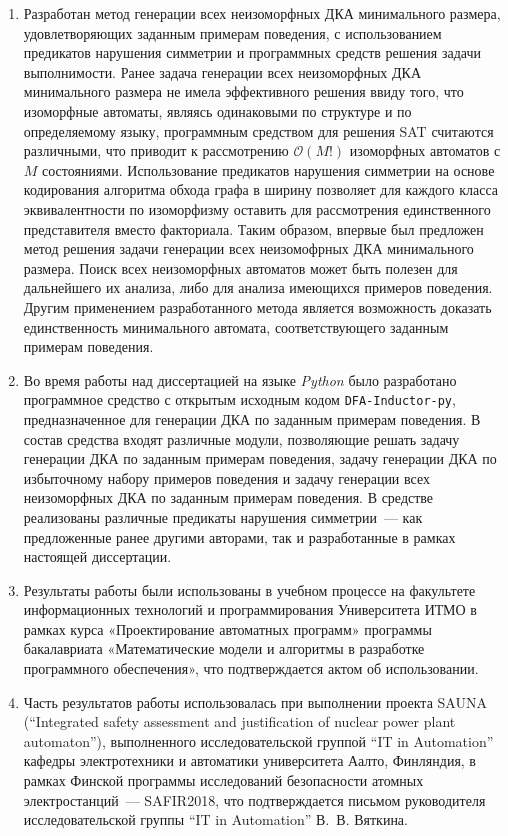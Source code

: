 \begin{enumerate}
  \item Разработан метод генерации всех неизоморфных ДКА минимального размера, удовлетворяющих заданным примерам поведения, с использованием предикатов нарушения симметрии и программных средств решения задачи выполнимости.
  Ранее задача генерации всех неизоморфных ДКА минимального размера не имела эффективного решения ввиду того, что изоморфные автоматы, являясь одинаковыми по структуре и по определяемому языку, программным средством для решения SAT считаются различными, что приводит к рассмотрению $\mathcal{O}\left(M!\right)$ изоморфных автоматов с $M$ состояниями.
  Использование предикатов нарушения симметрии на основе кодирования алгоритма обхода графа в ширину позволяет для каждого класса эквивалентности по изоморфизму оставить для рассмотрения единственного представителя вместо факториала. 
  Таким образом, впервые был предложен метод решения задачи генерации всех неизомофрных ДКА минимального размера.
  Поиск всех неизоморфных автоматов может быть полезен для дальнейшего их анализа, либо для анализа имеющихся примеров поведения.
  Другим применением разработанного метода является возможность доказать единственность минимального автомата, соответствующего заданным примерам поведения.

  \item Во время работы над диссертацией на языке \emph{Python} было разработано программное средство с открытым исходным кодом \texttt{DFA-Inductor-py}, предназначенное для генерации ДКА по заданным примерам поведения.
  В состав средства входят различные модули, позволяющие решать задачу генерации ДКА по заданным примерам поведения, задачу генерации ДКА по избыточному набору примеров поведения и задачу генерации всех неизоморфных ДКА по заданным примерам поведения.
  В средстве реализованы различные предикаты нарушения симметрии~--- как предложенные ранее другими авторами, так и разработанные в рамках настоящей диссертации.

  \item Результаты работы были использованы в учебном процессе на факультете информационных технологий и программирования Университета ИТМО в рамках курса «Проектирование автоматных программ» программы бакалавриата «Математические модели и алгоритмы в разработке программного обеспечения», что подтверждается актом об использовании.

  \item Часть результатов работы использовалась при выполнении проекта SAUNA (``Integrated safety assessment and justification of nuclear power plant automaton''), выполненного исследовательской группой ``IT in Automation'' кафедры электротехники и автоматики университета Аалто, Финляндия, в рамках Финской программы исследований безопасности атомных электростанций~--- SAFIR2018, что подтверждается письмом руководителя исследовательской группы ``IT in Automation'' В.~В. Вяткина.


\end{enumerate}
